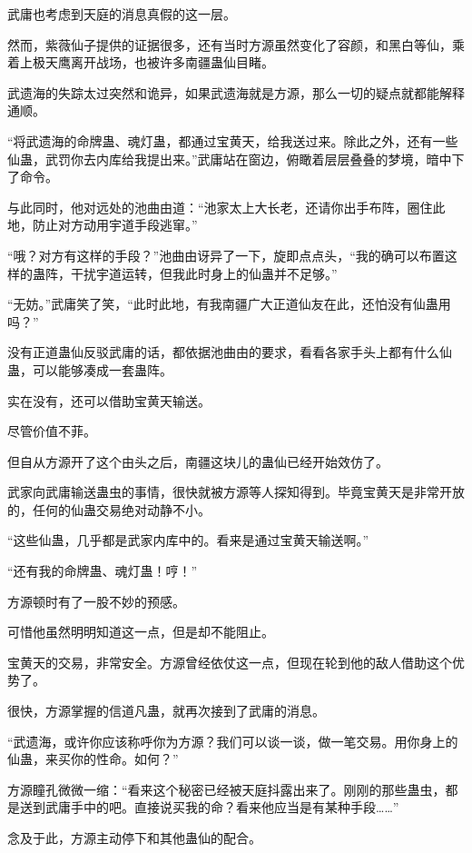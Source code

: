 
\begin{this_body}

武庸也考虑到天庭的消息真假的这一层。

然而，紫薇仙子提供的证据很多，还有当时方源虽然变化了容颜，和黑白等仙，乘着上极天鹰离开战场，也被许多南疆蛊仙目睹。

武遗海的失踪太过突然和诡异，如果武遗海就是方源，那么一切的疑点就都能解释通顺。

“将武遗海的命牌蛊、魂灯蛊，都通过宝黄天，给我送过来。除此之外，还有一些仙蛊，武罚你去内库给我提出来。”武庸站在窗边，俯瞰着层层叠叠的梦境，暗中下了命令。

与此同时，他对远处的池曲由道：“池家太上大长老，还请你出手布阵，圈住此地，防止对方动用宇道手段逃窜。”

“哦？对方有这样的手段？”池曲由讶异了一下，旋即点点头，“我的确可以布置这样的蛊阵，干扰宇道运转，但我此时身上的仙蛊并不足够。”

“无妨。”武庸笑了笑，“此时此地，有我南疆广大正道仙友在此，还怕没有仙蛊用吗？”

没有正道蛊仙反驳武庸的话，都依据池曲由的要求，看看各家手头上都有什么仙蛊，可以能够凑成一套蛊阵。

实在没有，还可以借助宝黄天输送。

尽管价值不菲。

但自从方源开了这个由头之后，南疆这块儿的蛊仙已经开始效仿了。

武家向武庸输送蛊虫的事情，很快就被方源等人探知得到。毕竟宝黄天是非常开放的，任何的仙蛊交易绝对动静不小。

“这些仙蛊，几乎都是武家内库中的。看来是通过宝黄天输送啊。”

“还有我的命牌蛊、魂灯蛊！哼！”

方源顿时有了一股不妙的预感。

可惜他虽然明明知道这一点，但是却不能阻止。

宝黄天的交易，非常安全。方源曾经依仗这一点，但现在轮到他的敌人借助这个优势了。

很快，方源掌握的信道凡蛊，就再次接到了武庸的消息。

“武遗海，或许你应该称呼你为方源？我们可以谈一谈，做一笔交易。用你身上的仙蛊，来买你的性命。如何？”

方源瞳孔微微一缩：“看来这个秘密已经被天庭抖露出来了。刚刚的那些蛊虫，都是送到武庸手中的吧。直接说买我的命？看来他应当是有某种手段……”

念及于此，方源主动停下和其他蛊仙的配合。


\end{this_body}
